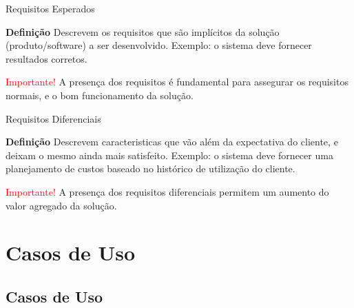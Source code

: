 \documentclass[xcolor=x11names,compress]{beamer}
\begin{document}
\begin{frame}{Requisitos Esperados}

\begin{alertblock}{\textbf{Definição}}
Descrevem os requisitos que são implícitos da solução (produto/software) a ser desenvolvido. Exemplo: o sistema deve fornecer resultados corretos.
\end{alertblock}

\pause

\begin{alertblock}{\centering \textcolor{red}{Importante!}}
A presença dos requisitos é fundamental para assegurar os requisitos normais, e o bom funcionamento da solução.
\end{alertblock}

\end{frame}

\begin{frame}{Requisitos Diferenciais}

\begin{alertblock}{\textbf{Definição}}
Descrevem caracteristicas que vão além da expectativa do cliente, e deixam o mesmo ainda mais satisfeito. Exemplo: o sistema deve fornecer uma planejamento de custos baseado no histórico de utilização do cliente.
\end{alertblock}

\pause

\begin{alertblock}{\centering \textcolor{red}{Importante!}}
A presença dos requisitos diferenciais permitem um aumento do valor agregado da solução.
\end{alertblock}

\end{frame}

\section{Casos de Uso}
\subsection{Casos de Uso}
\end{document}
